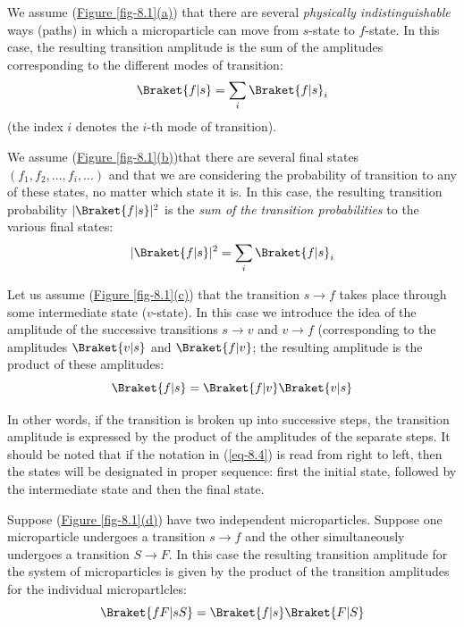 \documentclass[a4paper,sfsidenotes,colorlinks=true]{tufte-book}
\numberwithin{equation}{section}
\numberwithin{figure}{section}
\begin{document}
\begin{description}[font=\bfseries, leftmargin=1cm]
\item[First Rule.] We assume (\hyperref[fig-8.1]{Figure \ref{fig-8.1}(a)})
  that there are several \emph{physically indistinguishable} ways
  (paths) in which a microparticle can move from $s$-state to
  $f$-state. In this case, the resulting transition amplitude is the
  sum of the amplitudes corresponding to the different modes of
  transition:
\begin{equation}%
\Braket{f |s} = \sum_{i} \Braket{f|s}_{i}	
\label{eq-8.2} 
\end{equation}
(the index $i$ denotes the $i$-th mode of transition). 

\item[Second Rule.] We assume (\hyperref[fig-8.1]{Figure
    \ref{fig-8.1}(b)})that there are several final states $(f_{1}, f_{2},
 \ldots , f_{i}, \ldots)$ and that we are considering the probability
 of transition to any of these states, no matter which state it is. In
 this case, the resulting transition probability  $|\Braket{f|s}|^{2}$
 is the \emph{sum of the transition probabilities} to the various
 final states:
\begin{equation}%
|\Braket{f |s}|^{2} = \sum_{i} \Braket{f|s}_{i}	
\label{eq-8.3} 
\end{equation}

\item[Third Rule.] Let us assume (\hyperref[fig-8.1]{Figure
    \ref{fig-8.1}(c)}) that the transition $s \to f$ takes place
  through some intermediate state ($v$-state). In this case we
  introduce the idea of the amplitude of the successive transitions $s
  \to v$ and $v \to f$ (corresponding to the amplitudes $\Braket{v
    |s}$ and $\Braket{f|v}$; the resulting amplitude is the product of
  these amplitudes:
\begin{equation}%
\Braket{f |s} =  \Braket{f|v} \Braket{v|s}
\label{eq-8.4} 
\end{equation}

In other words, if the transition is broken up into successive steps,
the transition amplitude is expressed by the product of the amplitudes
of the separate steps. It should be noted that if the notation in
(\ref{eq-8.4}) is read from right to left, then the states will be designated
in proper sequence: first the initial state, followed by the
intermediate state and then the final state.


\item[Fourth Rule.] Suppose (\hyperref[fig-8.1]{Figure
    \ref{fig-8.1}(d)}) have two independent microparticles. Suppose
  one microparticle undergoes a transition $s \to f$ and the other
  simultaneously undergoes a transition $S \to F$. In this case the
  resulting transition amplitude for the system of microparticles is
  given by the product of the transition amplitudes for the individual
  micropartlcles: 
\begin{equation}%
\Braket{fF |sS} =  \Braket{f|s} \Braket{F|S}
\label{eq-8.5} 
\end{equation}

\end{description}
\end{document}
